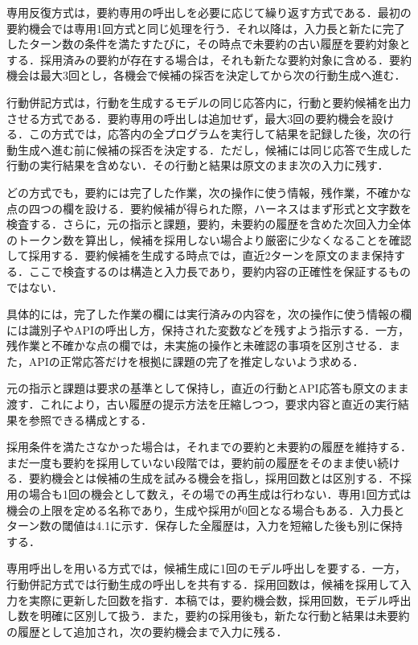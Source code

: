 \documentclass[letter]{ieicej}
\begin{document}
専用反復方式は，要約専用の呼出しを必要に応じて繰り返す方式である．最初の要約機会では専用1回方式と同じ処理を行う．それ以降は，入力長と新たに完了したターン数の条件を満たすたびに，その時点で未要約の古い履歴を要約対象とする．採用済みの要約が存在する場合は，それも新たな要約対象に含める．要約機会は最大3回とし，各機会で候補の採否を決定してから次の行動生成へ進む．

行動併記方式は，行動を生成するモデルの同じ応答内に，行動と要約候補を出力させる方式である．要約専用の呼出しは追加せず，最大3回の要約機会を設ける．この方式では，応答内の全プログラムを実行して結果を記録した後，次の行動生成へ進む前に候補の採否を決定する．ただし，候補には同じ応答で生成した行動の実行結果を含めない．その行動と結果は原文のまま次の入力に残す．

どの方式でも，要約には完了した作業，次の操作に使う情報，残作業，不確かな点の四つの欄を設ける．要約候補が得られた際，ハーネスはまず形式と文字数を検査する．さらに，元の指示と課題，要約，未要約の履歴を含めた次回入力全体のトークン数を算出し，候補を採用しない場合より厳密に少なくなることを確認して採用する．要約候補を生成する時点では，直近2ターンを原文のまま保持する．ここで検査するのは構造と入力長であり，要約内容の正確性を保証するものではない．

具体的には，完了した作業の欄には実行済みの内容を，次の操作に使う情報の欄には識別子やAPIの呼出し方，保持された変数などを残すよう指示する．一方，残作業と不確かな点の欄では，未実施の操作と未確認の事項を区別させる．また，APIの正常応答だけを根拠に課題の完了を推定しないよう求める．

元の指示と課題は要求の基準として保持し，直近の行動とAPI応答も原文のまま渡す．これにより，古い履歴の提示方法を圧縮しつつ，要求内容と直近の実行結果を参照できる構成とする．

採用条件を満たさなかった場合は，それまでの要約と未要約の履歴を維持する．まだ一度も要約を採用していない段階では，要約前の履歴をそのまま使い続ける．要約機会とは候補の生成を試みる機会を指し，採用回数とは区別する．不採用の場合も1回の機会として数え，その場での再生成は行わない．専用1回方式は機会の上限を定める名称であり，生成や採用が0回となる場合もある．入力長とターン数の閾値は4.1に示す．保存した全履歴は，入力を短縮した後も別に保持する．

専用呼出しを用いる方式では，候補生成に1回のモデル呼出しを要する．一方，行動併記方式では行動生成の呼出しを共有する．採用回数は，候補を採用して入力を実際に更新した回数を指す．本稿では，要約機会数，採用回数，モデル呼出し数を明確に区別して扱う．また，要約の採用後も，新たな行動と結果は未要約の履歴として追加され，次の要約機会まで入力に残る．
\end{document}
